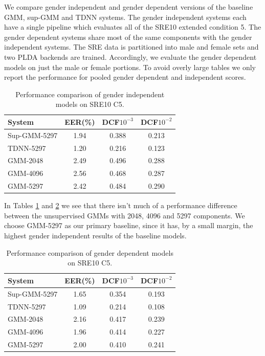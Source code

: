 \documentclass{article}
\begin{document}
We compare gender independent and gender dependent versions of the
baseline GMM, sup-GMM and TDNN systems. The gender independent
systems each have a single pipeline which evaluates all of the SRE10
extended condition 5. The gender dependent systems share most of the
same components with the gender independent systems. 
The SRE data is partitioned into male and female sets and two PLDA
backends are trained. Accordingly, we evaluate the gender
dependent models on just the male or female portions. To avoid 
overly large
tables we only report the performance for pooled gender dependent
and independent scores.

\begin{table}
\begin{center}
\begin{tabular}{l|ccc}
\hline
System & EER(\%) & DCF$10^{-3}$ & DCF$10^{-2}$ \\ \hline \hline
Sup-GMM-5297 & 1.94 & 0.388 & 0.213 \\
TDNN-5297 & 1.20 & 0.216 & 0.123 \\
GMM-2048 & 2.49 & 0.496 & 0.288 \\
GMM-4096 & 2.56 & 0.468 & 0.287 \\
GMM-5297 & 2.42 & 0.484 & 0.290 \\ \hline
\end{tabular}
\end{center}
\caption{Performance comparison of gender independent models on SRE10 C5.}
\label{gender_ind}
\end{table}

In Tables \ref{gender_ind} and \ref{gender_dep} we see that there
isn't much of a performance difference between
the unsupervised GMMs with 2048, 4096 and 5297 components. 
We choose GMM-5297 as our primary baseline, since it has, by a small margin,
the highest gender independent results of the baseline models.

\begin{table}
\begin{center}
\begin{tabular}{l|ccc}
\hline
System & EER(\%) & DCF$10^{-3}$ & DCF$10^{-2}$ \\ \hline \hline
Sup-GMM-5297 & 1.65 & 0.354 & 0.193 \\
TDNN-5297 & 1.09 & 0.214 & 0.108 \\
GMM-2048 & 2.16 & 0.417 & 0.239 \\
GMM-4096 & 1.96 & 0.414 & 0.227 \\
GMM-5297 & 2.00 & 0.410 & 0.241 \\ \hline
\end{tabular}
\end{center}
\caption{Performance comparison of gender dependent models on SRE10 C5.}
\label{gender_dep}
\end{table}
\end{document}
